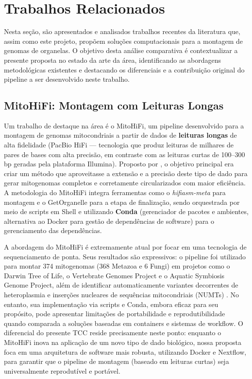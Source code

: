 
\chapter{Trabalhos Relacionados}
\label{cap:trabalhos}

Nesta seção, são apresentados e analisados trabalhos recentes da literatura que, assim como este projeto, propõem soluções computacionais para a montagem de genomas de organelas. O objetivo desta análise comparativa é contextualizar a presente proposta no estado da arte da área, identificando as abordagens metodológicas existentes e destacando os diferenciais e a contribuição original do pipeline a ser desenvolvido neste trabalho.

\section{MitoHiFi: Montagem com Leituras Longas}

Um trabalho de destaque na área é o MitoHiFi, um pipeline desenvolvido para a montagem de genomas mitocondriais a partir de dados de \textbf{leituras longas} de alta fidelidade (PacBio HiFi --- tecnologia que produz leituras de milhares de pares de bases com alta precisão, em contraste com as leituras curtas de 100--300 bp geradas pela plataforma Illumina). Proposto por , o objetivo principal era criar um método que aproveitasse a extensão e a precisão deste tipo de dado para gerar mitogenomas completos e corretamente circularizados com maior eficiência. A metodologia do MitoHiFi integra ferramentas como o \textit{hifiasm-meta} para montagem e o GetOrganelle para a etapa de finalização, sendo orquestrada por meio de scripts em Shell e utilizando \textbf{Conda} (gerenciador de pacotes e ambientes, alternativa ao Docker para gestão de dependências de software) para o gerenciamento das dependências.

A abordagem do MitoHiFi é extremamente atual por focar em uma tecnologia de sequenciamento de ponta. Seus resultados são expressivos: o pipeline foi utilizado para montar 374 mitogenomas (368 Metazoa e 6 Fungi) em projetos como o Darwin Tree of Life, o Vertebrate Genomes Project e o Aquatic Symbiosis Genome Project, além de identificar automaticamente variantes decorrentes de heteroplasmia e inserções nucleares de sequências mitocondriais (NUMTs) \cite{ulianosilva2023}. No entanto, sua implementação via scripts e Conda, embora eficaz para seu propósito, pode apresentar limitações de portabilidade e reprodutibilidade quando comparada a soluções baseadas em containers e sistemas de workflow. O diferencial do presente TCC reside precisamente neste ponto: enquanto o MitoHiFi inova na aplicação de um novo tipo de dado biológico, nossa proposta foca em uma arquitetura de software mais robusta, utilizando Docker e Nextflow, para garantir que o pipeline de montagem (baseado em leituras curtas) seja universalmente reprodutível e portável.

